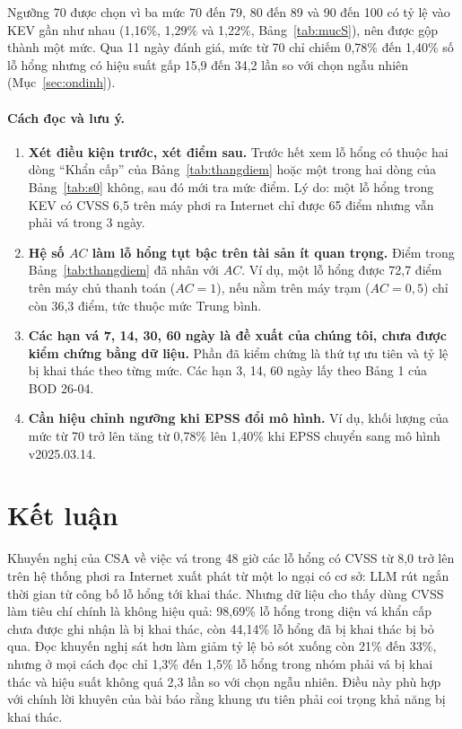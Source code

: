 \documentclass[runningheads]{llncs}
\begin{document}
Ngưỡng 70 được chọn vì ba mức 70 đến 79, 80 đến 89 và 90 đến 100 có tỷ lệ vào KEV gần như nhau (1,16\%, 1,29\% và
1,22\%, Bảng~\ref{tab:mucS}), nên được gộp thành một mức. Qua 11 ngày đánh giá, mức từ 70 chỉ chiếm 0,78\% đến
1,40\% số lỗ hổng nhưng có hiệu suất gấp 15,9 đến 34,2 lần so với chọn ngẫu nhiên (Mục~\ref{sec:ondinh}).

\paragraph{Cách đọc và lưu ý.}
\begin{enumerate}
\item \textbf{Xét điều kiện trước, xét điểm sau.} Trước hết xem lỗ hổng có thuộc hai dòng ``Khẩn cấp'' của
Bảng~\ref{tab:thangdiem} hoặc một trong hai dòng của Bảng~\ref{tab:s0} không, sau đó mới tra mức điểm. Lý do: một lỗ
hổng trong KEV có CVSS 6,5 trên máy phơi ra Internet chỉ được 65 điểm nhưng vẫn phải vá trong 3 ngày.
\item \textbf{Hệ số $AC$ làm lỗ hổng tụt bậc trên tài sản ít quan trọng.} Điểm trong Bảng~\ref{tab:thangdiem} đã nhân
với $AC$. Ví dụ, một lỗ hổng được 72,7 điểm trên máy chủ thanh toán ($AC = 1$), nếu nằm trên máy trạm ($AC = 0{,}5$) chỉ
còn 36,3 điểm, tức thuộc mức Trung bình.
\item \textbf{Các hạn vá 7, 14, 30, 60 ngày là đề xuất của chúng tôi, chưa được kiểm chứng bằng dữ liệu.} Phần đã kiểm
chứng là thứ tự ưu tiên và tỷ lệ bị khai thác theo từng mức. Các hạn 3, 14, 60 ngày lấy theo Bảng 1 của BOD 26-04.
\item \textbf{Cần hiệu chỉnh ngưỡng khi EPSS đổi mô hình.} Ví dụ, khối lượng của mức từ 70 trở lên tăng từ 0,78\% lên 1,40\% khi
EPSS chuyển sang mô hình v2025.03.14.
\end{enumerate}

\section{Kết luận}\label{sec:ketluan}

Khuyến nghị của CSA về việc vá trong 48 giờ các lỗ hổng có CVSS từ 8,0 trở lên trên hệ thống phơi ra Internet xuất
phát từ một lo ngại có cơ sở: LLM rút ngắn thời gian từ công bố lỗ hổng tới khai thác. Nhưng dữ
liệu cho thấy dùng CVSS làm tiêu chí chính là không hiệu quả: 98,69\% lỗ hổng trong diện vá khẩn
cấp chưa được ghi nhận là bị khai thác, còn 44,14\% lỗ hổng đã bị khai thác bị bỏ qua. Đọc khuyến nghị sát
hơn làm giảm tỷ lệ bỏ sót xuống còn 21\% đến 33\%, nhưng ở mọi cách đọc chỉ 1,3\% đến 1,5\% lỗ hổng trong nhóm
phải vá bị khai thác và hiệu suất không quá 2,3 lần so với chọn ngẫu nhiên.
Điều này phù hợp với chính lời khuyên của bài báo rằng khung ưu tiên phải coi trọng khả năng bị
khai thác.
\end{document}
